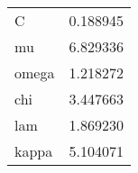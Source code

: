 \begin{tabular}{ll}
C & 0.188945\\
mu & 6.829336\\
omega & 1.218272\\
chi & 3.447663\\
lam & 1.869230\\
kappa & 5.104071\\
\end{tabular}
